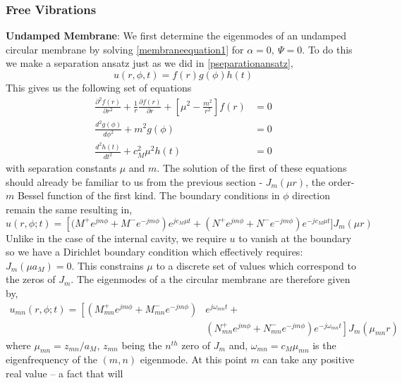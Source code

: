 \subsubsection*{Free Vibrations}
\noindent\textbf{Undamped Membrane}: We first determine the eigenmodes of an undamped circular membrane by solving \eqref{membraneequation1} for $\alpha=0,\ \Psi=0$. To do this 
we make a separation ansatz just as we did in \eqref{pseparationansatz},
\begin{equation}\label{mseparationansatz}
 u(r,\phi,t)=f(r)g(\phi)h(t)
\end{equation}
This gives us the following set of equations
\begin{align}
 \frac{\partial^2 f(r)}{\partial r^2} + \frac{1}{r}\frac{\partial f(r)}{\partial r}+\left[\mu^2-\frac{m^2}{r^2}\right]f(r)&=0\label{besselequation2}\\
  \frac{d^2 g(\phi)}{d\phi^2}+m^2g(\phi)&=0\\
 \frac{d^2 h(t)}{dt^2}+c^2_M\mu^2h(t)&=0
\end{align}
with separation constants $\mu$ and $m$. The solution of the first of these equations should already be familiar to us from the previous section - $J_m(\mu r)$,
 the order-$m$ Bessel function of the first kind. The boundary conditions in $\phi$ direction remain the same resulting in,
\begin{equation}\label{specificmembrane1}
 u(r,\phi;t)=\left[(M^+e^{jm\phi}+M^-e^{-jm\phi}\right)e^{jc_M\mu t}+(N^+e^{jm\phi}+N^-e^{-jm\phi})e^{-jc_M\mu t}] J_m(\mu r)
\end{equation}
Unlike in the case of the internal cavity, we require $u$ to vanish at the boundary so we have a Dirichlet boundary condition which
effectively requires: $J_m(\mu a_M)=0$. This constrains $\mu$ to a discrete set of values which correspond to the zeros of $J_m$. The eigenmodes of a 
the circular membrane are therefore given by,
\begin{equation}\label{membraneeigen}
\begin{split}
 u_{mn}(r,\phi;t)=\left[(M^+_{mn}e^{jm\phi}+M^-_{mn}e^{-jm\phi})\right.& e^{j\omega_{mn} t}+ \\
 &\left.(N^+_{mn}e^{jm\phi}+N^-_{mn}e^{-jm\phi})e^{-j\omega_{mn} t}\right] J_m(\mu_{mn} r)
 \end{split}
\end{equation}
where $\mu_{mn}=z_{mn}/a_M$, $z_{mn}$ being the $n^{th}$ zero of $J_m$ and, $\omega_{mn}=c_M\mu_{mn}$ is
the eigenfrequency of the $(m,n)$ eigenmode. At this point $m$ can take any positive real value -- a fact that will
